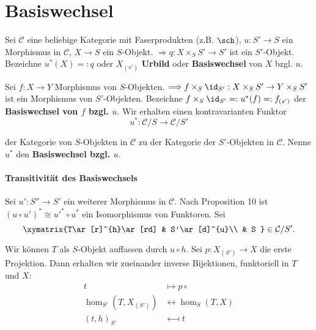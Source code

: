 \section{Basiswechsel}

Sei $\mathcal{C}$ eine beliebige Kategorie mit Faserprodukten (z.B.
$\sch$), $u:S'\rightarrow S$ ein Morphismus in $\mathcal{C}$, $X\rightarrow S$
ein $S$-Objekt. $\Longrightarrow q:X\times_{S}S'\rightarrow S'$
ist ein $S'$-Objekt. Bezeichne $u^{\ast}(X)=:q$ oder $X_{(s')}$
\textbf{Urbild} oder \textbf{Basiswechsel} von $X$ bzgl. $u$.\medskip{}

Sei $f:X\rightarrow Y$ Morphismus von $S$-Objekten. $\Longrightarrow f\times_{S}\id_{S'}:X\times_{S}S'\rightarrow Y\times_{S}S'$
ist ein Morphismus von $S'$-Objekten. Bezeichne $f\times_{S}\id_{S'}=:u^{*}(f)=:f_{(s')}$
der \textbf{Basiswechsel von $f$ bzgl. $u$}. Wir erhalten einen
kontravarianten Funktor
\[
  u^{\ast}:\mathcal{C}/S\longrightarrow\mathcal{C}/S'
\]

der Kategorie von $S$-Objekten in $\mathcal{C}$ zu der Kategorie
der $S'$-Objekten in $\mathcal{C}$. Nenne $u^{\ast}$ den \textbf{Basiswechsel
  bzgl. $u$}.

\paragraph{Transitivität des Basiswechsels}

Sei $u':S''\rightarrow S'$ ein weiterer Morphismus in $\mathcal{C}$.
Nach Proposition 10 ist $(u\circ u')^{\ast}\cong u'^{\ast}\circ u^{\ast}$
ein Isomorphismus von Funktoren. Sei
\[
  \xymatrix{T\ar[r]^{h}\ar[rd] & S'\ar[d]^{u}\\
    & S
  }
  \in\mathcal{C}/S'.
\]

Wir können $T$ als $S$-Objekt auffassen durch $u\circ h$. Sei $p:X_{(S')}\rightarrow X$
die erste Projektion. Dann erhalten wir zueinander inverse Bijektionen,
funktoriell in $T$ und $X$:
\begin{align*}
  t & \longmapsto p\circ\\
  \hom_{S'}(T,X_{(S')}) & \longleftrightarrow\hom_{S}(T,X)\\
  (t,h)_{S'} & \longmapsfrom t
\end{align*}

